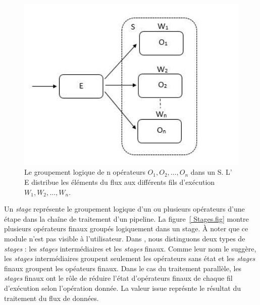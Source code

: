 
\begin{figure}[ht]
\centering
     \includegraphics[width=1.0\textwidth]{Figures/Stages.jpg}
      \caption{Le groupement logique de n op\'erateurs $O_1, O_2, \ldots, O_n$ dans un  S.  L' E distribue les \'el\'ements du flux aux diff\'erents fils d'ex\'ecution $W_1, W_2, \ldots, W_n$.}
       \label{Stages.fig}
\end{figure}

Un \emph{stage} repr\'esente le groupement logique d'un ou plusieurs op\'erateurs d'une \'etape dans la cha\^ine de traitement d'un pipeline. La figure~\ref{ Stages.fig} montre plusieurs op\'erateurs finaux group\'es logiquement dans un stage.  \`A noter que ce module n'est pas visible \`a l'utilisateur. Dans , nous distinguons deux types de \emph{stages} : les \emph{stages} interm\'ediaires et les \emph{stages} finaux. Comme leur nom le sugg\`ere, les \emph{stages} interm\'ediaires groupent seulement les op\'erateurs sans \'etat et les \emph{stages} finaux groupent les op\'eateurs finaux. Dans le cas du traitement parall\`ele, les \emph{stages} finaux ont le r\^ole de r\'eduire l'\'etat d'op\'erateurs finaux de chaque fil d'ex\'ecution selon l'op\'eration donn\'ee. La valeur issue repr\'esnte le r\'esultat du traitement du flux de donn\'ees.



